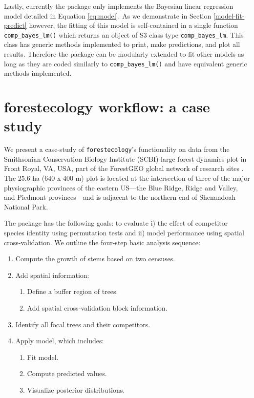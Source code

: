 \documentclass[12pt]{article}
\providecommand{\tightlist}{%
  \setlength{\itemsep}{0pt}\setlength{\parskip}{0pt}}
\begin{document}
Lastly, currently the package only implements the Bayesian linear
regression model detailed in Equation \ref{eq:model}. As we demonstrate
in Section \ref{model-fit-predict} however, the fitting of this model is
self-contained in a single function \texttt{comp\_bayes\_lm()} which
returns an object of S3 class type \texttt{comp\_bayes\_lm}. This class
has generic methods implemented to print, make predictions, and plot all
results. Therefore the package can be modularly extended to fit other
models as long as they are coded similarly to \texttt{comp\_bayes\_lm()}
and have equivalent generic methods implemented.

\hypertarget{casestudy}{%
\section{forestecology workflow: a case study}\label{casestudy}}

We present a case-study of \texttt{forestecology}'s functionality on
data from the Smithsonian Conservation Biology Institute (SCBI) large
forest dynamics plot in Front Royal, VA, USA, part of the ForestGEO
global network of research sites
\citep[\citet{andersonteixeira_ctfs-forestgeo_2015}]{bourg_initial_2013}.
The 25.6 ha (640 x 400 m) plot is located at the intersection of three
of the major physiographic provinces of the eastern US---the Blue Ridge,
Ridge and Valley, and Piedmont provinces---and is adjacent to the
northern end of Shenandoah National Park.

The package has the following goals: to evaluate i) the effect of
competitor species identity using permutation tests and ii) model
performance using spatial cross-validation. We outline the four-step
basic analysis sequence:

\begin{enumerate}
\def\labelenumi{\arabic{enumi}.}
\tightlist
\item
  Compute the growth of stems based on two censuses.
\item
  Add spatial information:

  \begin{enumerate}
  \def\labelenumii{\arabic{enumii}.}
  \tightlist
  \item
    Define a buffer region of trees.
  \item
    Add spatial cross-validation block information.
  \end{enumerate}
\item
  Identify all focal trees and their competitors.
\item
  Apply model, which includes:

  \begin{enumerate}
  \def\labelenumii{\arabic{enumii}.}
  \tightlist
  \item
    Fit model.
  \item
    Compute predicted values.
  \item
    Visualize posterior distributions.
  \end{enumerate}
\end{enumerate}
\end{document}
